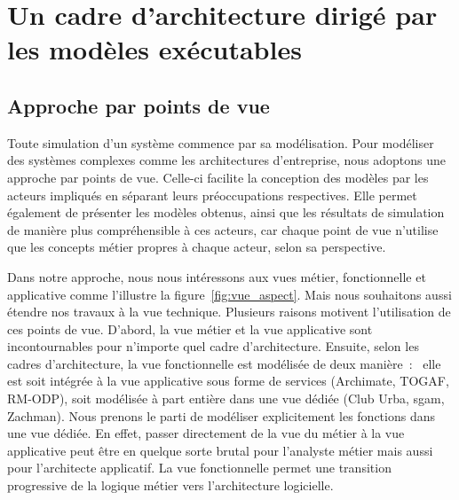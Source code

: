 \section{Un cadre d'architecture dirigé par les modèles exécutables}

\subsection{Approche par points de vue}

Toute simulation d'un système commence par sa modélisation. Pour modéliser des 
systèmes complexes comme les architectures d'entreprise, nous adoptons une 
approche par points de vue. Celle-ci facilite la conception des modèles par les 
acteurs impliqués en séparant leurs préoccupations respectives. Elle permet 
également de présenter les modèles obtenus, ainsi que les résultats de 
simulation de manière plus compréhensible à ces acteurs, car chaque point de vue 
n'utilise que les concepts métier propres à chaque acteur, selon sa perspective. 

Dans notre approche, nous nous intéressons aux vues métier, fonctionnelle et 
applicative comme l'illustre la figure~\ref{fig:vue_aspect}. Mais nous 
souhaitons aussi étendre nos travaux à la vue technique. 
Plusieurs raisons motivent l'utilisation de ces points de vue. D'abord, la vue 
métier et la vue applicative sont incontournables pour n'importe quel cadre 
d'architecture. Ensuite, selon les cadres d'architecture, la vue fonctionnelle 
est modélisée de deux manière~:~ elle est soit intégrée à la vue applicative 
sous forme de services (Archimate, TOGAF, RM-ODP), soit modélisée à part entière 
dans une vue dédiée (Club Urba, \gls{sgam}, Zachman). Nous prenons le parti de 
modéliser explicitement les fonctions dans une vue dédiée. En effet, passer 
directement de la vue du métier à la vue applicative peut être en quelque sorte 
brutal pour l'analyste métier mais aussi pour l'architecte applicatif. La vue 
fonctionnelle permet une transition progressive de la logique métier vers 
l'architecture logicielle.

